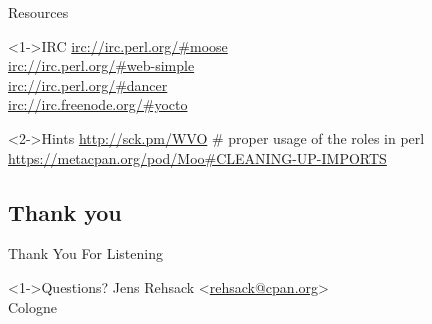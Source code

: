 \documentclass[ngerman,xcolor={table,dvipsnames},smaller,compress,hyperref={bookmarks,colorlinks}]{beamer}%
\begin{document}
\begin{frame}[t,fragile]{Resources}
\begin{block}<1->{IRC}
\url{irc://irc.perl.org/#moose} \\
\url{irc://irc.perl.org/#web-simple} \\
\url{irc://irc.perl.org/#dancer} \\
\url{irc://irc.freenode.org/#yocto}
\end{block}

\begin{block}<2->{Hints}
\url{http://sck.pm/WVO} \# proper usage of the roles in perl \\
\url{https://metacpan.org/pod/Moo\#CLEANING-UP-IMPORTS}
\end{block}
\end{frame}

\subsection{Thank you}

\begin{frame}[fragile]{Thank You For Listening}
\begin{block}<1->{Questions?}
Jens Rehsack \textless{}\href{mailto:rehsack@cpan.org}{rehsack@cpan.org}\textgreater{} \\
Cologne
\end{block}
\end{frame}
\end{document}
